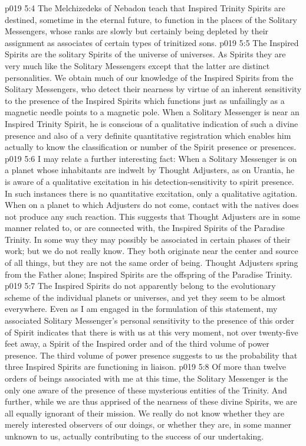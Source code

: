 \vs p019 5:4 The Melchizedeks of Nebadon teach that Inspired Trinity Spirits are destined, sometime in the eternal future, to function in the places of the Solitary Messengers, whose ranks are slowly but certainly being depleted by their assignment as associates of certain types of trinitized sons.
\pc \vs p019 5:5 The Inspired Spirits are the solitary Spirits of the universe of universes. As Spirits they are very much like the Solitary Messengers except that the latter are distinct personalities. We obtain much of our knowledge of the Inspired Spirits from the Solitary Messengers, who detect their nearness by virtue of an inherent sensitivity to the presence of the Inspired Spirits which functions just as unfailingly as a magnetic needle points to a magnetic pole. When a Solitary Messenger is near an Inspired Trinity Spirit, he is conscious of a qualitative indication of such a divine presence and also of a very definite quantitative registration which enables him actually to know the classification or number of the Spirit presence or presences.
\vs p019 5:6 I may relate a further interesting fact: When a Solitary Messenger is on a planet whose inhabitants are indwelt by Thought Adjusters, as on Urantia, he is aware of a qualitative excitation in his detection\hyp{}sensitivity to spirit presence. In such instances there is no quantitative excitation, only a qualitative agitation. When on a planet to which Adjusters do not come, contact with the natives does not produce any such reaction. This suggests that Thought Adjusters are in some manner related to, or are connected with, the Inspired Spirits of the Paradise Trinity. In some way they may possibly be associated in certain phases of their work; but we do not really know. They both originate near the center and source of all things, but they are not the same order of being. Thought Adjusters spring from the Father alone; Inspired Spirits are the offspring of the Paradise Trinity.
\vs p019 5:7 The Inspired Spirits do not apparently belong to the evolutionary scheme of the individual planets or universes, and yet they seem to be almost everywhere. Even as I am engaged in the formulation of this statement, my associated Solitary Messenger’s personal sensitivity to the presence of this order of Spirit indicates that there is with us at this very moment, not over twenty\hyp{}five feet away, a Spirit of the Inspired order and of the third volume of power presence. The third volume of power presence suggests to us the probability that three Inspired Spirits are functioning in liaison.
\pc \vs p019 5:8 Of more than twelve orders of beings associated with me at this time, the Solitary Messenger is the only one aware of the presence of these mysterious entities of the Trinity. And further, while we are thus apprised of the nearness of these divine Spirits, we are all equally ignorant of their mission. We really do not know whether they are merely interested observers of our doings, or whether they are, in some manner unknown to us, actually contributing to the success of our undertaking.
